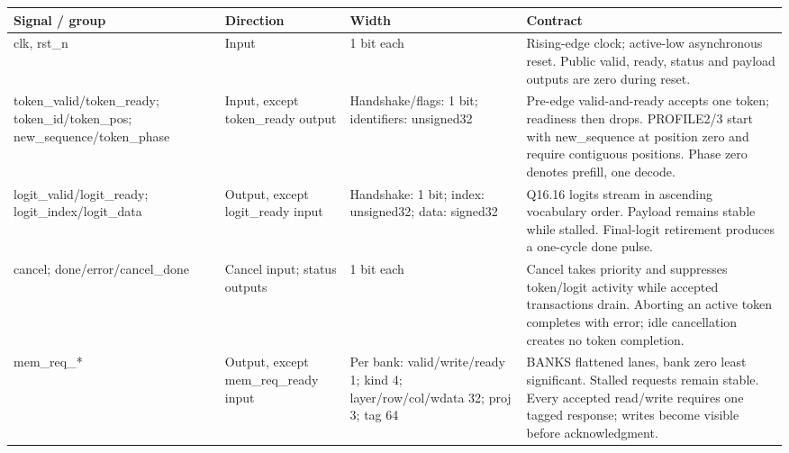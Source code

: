 \documentclass[11pt,a4paper]{article}
\begin{document}
{\small\renewcommand{\arraystretch}{1.18}\begin{longtable}{@{}L{0.21\textwidth}|L{0.12\textwidth}|L{0.12\textwidth}|L{0.45\textwidth}@{}}\toprule

\textbf{Signal /\allowbreak{} group} & \textbf{Direction} & \textbf{Width} & \textbf{Contract}\\\midrule\endhead

clk,\allowbreak{} rst\_\allowbreak{}n & Input & 1 bit each & Rising-edge clock; active-low asynchronous reset. Public valid,\allowbreak{} ready,\allowbreak{} status and payload outputs are zero during reset.\\[2pt]\hline

token\_\allowbreak{}valid/\allowbreak{}token\_\allowbreak{}ready; token\_\allowbreak{}id/\allowbreak{}token\_\allowbreak{}pos; new\_\allowbreak{}sequence/\allowbreak{}token\_\allowbreak{}phase & Input,\allowbreak{} except token\_\allowbreak{}ready output & Handshake/\allowbreak{}flags: 1 bit; identifiers: unsigned\allowbreak{}32 & Pre-edge valid-and-ready accepts one token; readiness then drops. PROFILE2/\allowbreak{}3 start with new\_\allowbreak{}sequence at position zero and require contiguous positions. Phase zero denotes prefill,\allowbreak{} one decode.\\[2pt]\hline

logit\_\allowbreak{}valid/\allowbreak{}logit\_\allowbreak{}ready; logit\_\allowbreak{}index/\allowbreak{}logit\_\allowbreak{}data & Output,\allowbreak{} except logit\_\allowbreak{}ready input & Handshake: 1 bit; index: unsigned\allowbreak{}32; data: signed32 & Q16.16 logits stream in ascending vocabulary order. Payload remains stable while stalled. Final-logit retirement produces a one-cycle done pulse.\\[2pt]\hline

cancel; done/\allowbreak{}error/\allowbreak{}cancel\_\allowbreak{}done & Cancel input; status outputs & 1 bit each & Cancel takes priority and suppresses token/\allowbreak{}logit activity while accepted transactions drain. Aborting an active token completes with error; idle cancellation creates no token completion.\\[2pt]\hline

mem\_\allowbreak{}req\_\allowbreak{}*\allowbreak{} & Output,\allowbreak{} except mem\_\allowbreak{}req\_\allowbreak{}ready input & Per bank: valid/\allowbreak{}write/\allowbreak{}ready 1; kind 4; layer/\allowbreak{}row/\allowbreak{}col/\allowbreak{}wdata 32; proj 3; tag 64 & BANKS flattened lanes,\allowbreak{} bank zero least significant. Stalled requests remain stable. Every accepted read/\allowbreak{}write requires one tagged response; writes become visible before acknowledgment.\\[2pt]\hline


\end{longtable}}
\end{document}
